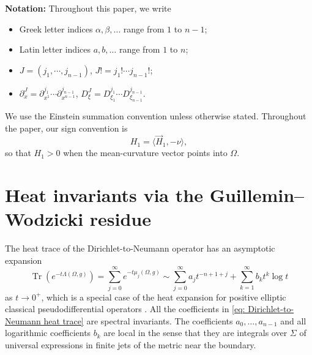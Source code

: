 \documentclass[11pt]{amsart}
\newcommand{\Tr}{\operatorname{Tr}}
\theoremstyle{definition}
\numberwithin{equation}{section}
\begin{document}
	
	{\bf Notation:} Throughout this paper, we write 
	\begin{itemize}
		\item Greek letter indices $\alpha,\beta,\dots$ range from $1$ to $n-1$;
		\item Latin letter indices $a,b,\dots$ range from $1$ to $n$;
		\item $J=(j_1, \cdots, j_{n-1})$, $J!=j_1!\cdots j_{n-1}!$;
		\item $\partial_x^J=\partial_{x^1}^{j_1} \cdots \partial_{x^{n-1}}^{j_{n-1}}$,  $D_{\xi}^J=D_{\xi_1}^{j_1} \cdots D_{\xi_{n-1}}^{j_{n-1}}$.
		
	\end{itemize}
	We use the Einstein summation convention unless otherwise stated. 
	Throughout the paper, our sign convention is
	\[
	H_1=\langle\vec H_1,-\nu\rangle,
	\]
	so that $H_1>0$ when the mean-curvature vector points into $\Omega$.  
	
	\section{Heat invariants via the Guillemin--Wodzicki  residue}\label{sec: preliminaries}
	
	The heat trace of the Dirichlet-to-Neumann operator has an asymptotic expansion
	\begin{equation}
		\label{eq: Dirichlet-to-Neumann heat trace}
		\Tr(e^{-t\Lambda(\Omega,g)})
		=
		\sum_{j=0}^\infty e^{-t\mu_j(\Omega,g)}
		\sim
		\sum_{j=0}^\infty a_jt^{-n+1+j}
		+
		\sum_{k=1}^\infty b_kt^k\log t	 
	\end{equation}
	as $t \to 0^+$,  which is a special case of the heat expansion for positive elliptic classical pseudodifferential operators \cite[Corollary 2.2$'$]{duistermaatSpectrumPositiveElliptic1975}.  All the  coefficients in \eqref{eq: Dirichlet-to-Neumann heat trace} are spectral invariants.  The coefficients $a_0,\ldots,a_{n-1}$ and all logarithmic coefficients $b_k$ are local in the sense that they are integrals over $\Sigma$ of universal expressions in finite jets of the metric near the boundary.
	
\end{document}
